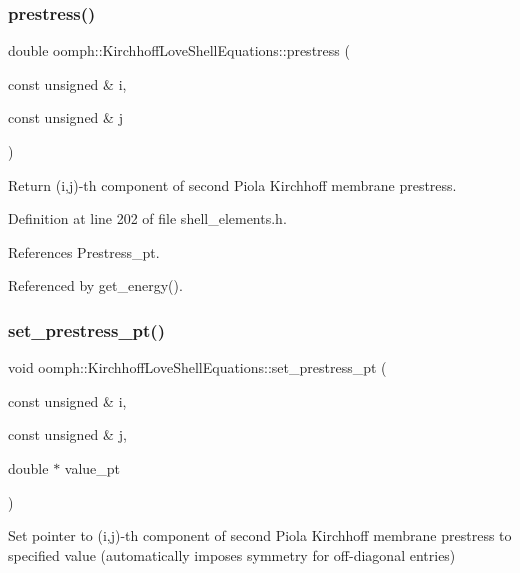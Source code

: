 \subsubsection{\texorpdfstring{prestress()}{prestress()}}
{\footnotesize\ttfamily double oomph\+::\+Kirchhoff\+Love\+Shell\+Equations\+::prestress (\begin{DoxyParamCaption}\item[{const unsigned \&}]{i,  }\item[{const unsigned \&}]{j }\end{DoxyParamCaption})\hspace{0.3cm}{\ttfamily [inline]}}



Return (i,j)-\/th component of second Piola Kirchhoff membrane prestress. 



Definition at line 202 of file shell\+\_\+elements.\+h.



References Prestress\+\_\+pt.



Referenced by get\+\_\+energy().

\mbox{\label{classoomph_1_1KirchhoffLoveShellEquations_abbe7f5f484c4baa0b5859e46aa5e587a}} 
\subsubsection{\texorpdfstring{set\+\_\+prestress\+\_\+pt()}{set\_prestress\_pt()}}
{\footnotesize\ttfamily void oomph\+::\+Kirchhoff\+Love\+Shell\+Equations\+::set\+\_\+prestress\+\_\+pt (\begin{DoxyParamCaption}\item[{const unsigned \&}]{i,  }\item[{const unsigned \&}]{j,  }\item[{double $\ast$}]{value\+\_\+pt }\end{DoxyParamCaption})\hspace{0.3cm}{\ttfamily [inline]}}



Set pointer to (i,j)-\/th component of second Piola Kirchhoff membrane prestress to specified value (automatically imposes symmetry for off-\/diagonal entries) 



